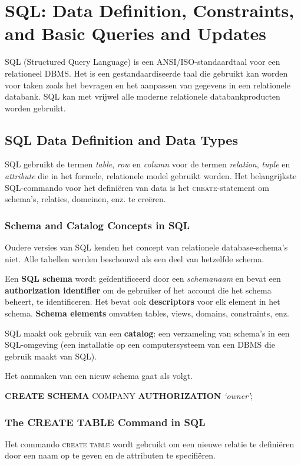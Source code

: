 \chapter{SQL: Data Definition, Constraints, and Basic Queries and Updates}
SQL (Structured Query Language) is een ANSI/ISO-standaardtaal voor een relationeel DBMS. Het is een gestandaardiseerde taal die gebruikt kan worden voor taken zoals het bevragen en het aanpassen van gegevens in een relationele databank. SQL kan met vrijwel alle moderne relationele databankproducten worden gebruikt. 



\section{SQL Data Definition and Data Types}
SQL gebruikt de termen \textit{table}, \textit{row} en \textit{column} voor de termen \textit{relation}, \textit{tuple} en \textit{attribute} die in het formele, relationele model gebruikt worden. Het belangrijkste SQL-commando voor het defini\"eren van data is het \textsc{create}-statement om schema's, relaties, domeinen, enz. te cre\"eren.


\subsection{Schema and Catalog Concepts in SQL}
Oudere versies van SQL kenden het concept van relationele database-schema's niet. Alle tabellen werden beschouwd als een deel van hetzelfde schema.

Een \textbf{SQL schema} wordt ge\"identificeerd door een \textit{schemanaam} en bevat een \textbf{authorization identifier} om de gebruiker of het account die het schema beheert, te identificeren. Het bevat ook \textbf{descriptors} voor elk element in het schema. \textbf{Schema elements} omvatten tables, views, domains, constraints, enz.

SQL maakt ook gebruik van een \textbf{catalog}: een verzameling van schema's in een SQL-omgeving (een installatie op een computersysteem van een DBMS die gebruik maakt van SQL).

Het aanmaken van een nieuw schema gaat als volgt.

\vspace{1mm}\hspace{10mm}
\textbf{CREATE SCHEMA} COMPANY \textbf{AUTHORIZATION} \textit{`owner'};


\subsection{The CREATE TABLE Command in SQL }
Het commando \textsc{create table} wordt gebruikt om een nieuwe relatie te defini\"eren door een naam op te geven en de attributen te specifi\"eren.

